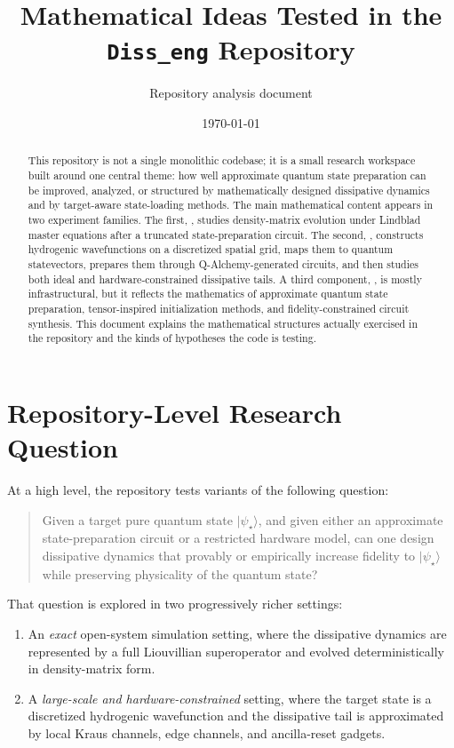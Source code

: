 \documentclass[11pt,a4paper]{article}
\title{Mathematical Ideas Tested in the \texttt{Diss\_eng} Repository}
\author{Repository analysis document}
\date{\today}
\begin{document}
\maketitle

\begin{abstract}
This repository is not a single monolithic codebase; it is a small research workspace built around one central theme: how well approximate quantum state preparation can be improved, analyzed, or structured by mathematically designed dissipative dynamics and by target-aware state-loading methods. The main mathematical content appears in two experiment families. The first, , studies density-matrix evolution under Lindblad master equations after a truncated state-preparation circuit. The second, , constructs hydrogenic wavefunctions on a discretized spatial grid, maps them to quantum statevectors, prepares them through Q-Alchemy-generated circuits, and then studies both ideal and hardware-constrained dissipative tails. A third component, , is mostly infrastructural, but it reflects the mathematics of approximate quantum state preparation, tensor-inspired initialization methods, and fidelity-constrained circuit synthesis. This document explains the mathematical structures actually exercised in the repository and the kinds of hypotheses the code is testing.
\end{abstract}

\section{Repository-Level Research Question}
At a high level, the repository tests variants of the following question:
\begin{quote}
Given a target pure quantum state $\lvert \psi_\star\rangle$, and given either an approximate state-preparation circuit or a restricted hardware model, can one design dissipative dynamics that provably or empirically increase fidelity to $\lvert \psi_\star\rangle$ while preserving physicality of the quantum state?
\end{quote}

That question is explored in two progressively richer settings:
\begin{enumerate}[label=\arabic*.]
  \item An \emph{exact} open-system simulation setting, where the dissipative dynamics are represented by a full Liouvillian superoperator and evolved deterministically in density-matrix form.
  \item A \emph{large-scale and hardware-constrained} setting, where the target state is a discretized hydrogenic wavefunction and the dissipative tail is approximated by local Kraus channels, edge channels, and ancilla-reset gadgets.
\end{enumerate}
\end{document}
